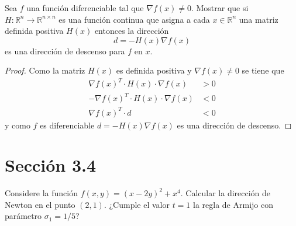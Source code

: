 \documentclass{article}
\newenvironment{theorem}[2][Ejercicio]{\begin{trivlist}
\item[\hskip \labelsep {\bfseries #1}\hskip \labelsep {\bfseries #2.}]}{\end{trivlist}}
\begin{document}
\begin{theorem}{4}
    Sea \(f\) una función diferenciable tal que \(\nabla f(x) \neq 0\).
    Mostrar que si \(H : \mathbb{R}^n \to \mathbb{R}^{n \times n}\) es una función continua que asigna a
    cada \(x \in \mathbb{R}^n\) una matriz definida positiva \(H(x)\) entonces la dirección
    \[
        d = - H(x) \nabla f(x)
    \]
    es una dirección de descenso para \(f\) en \(x\).
\end{theorem}

\begin{proof}
    Como la matriz  \( H(x) \) es definida positiva y \( \nabla f(x) \neq 0 \) se tiene que \begin{align*}
        {\nabla f(x)}^T \cdot H(x) \cdot \nabla f(x)  & > 0 \\
        -{\nabla f(x)}^T \cdot H(x) \cdot \nabla f(x) & < 0 \\
        {\nabla f(x)}^T \cdot d                       & < 0
    \end{align*}
    y como \( f \) es diferenciable \( d = - H(x) \nabla{f(x)} \) es una dirección de descenso.
\end{proof}

\section*{Sección 3.4}
\begin{theorem}{5}
    Considere la función \( f(x,y) = {(x - 2y)}^2 + x^4 \).
    Calcular la dirección de Newton en el punto \((2,1)\).
    ¿Cumple el valor \(t = 1\) la regla de Armijo con parámetro \(\sigma_1 = 1/5\)?
\end{theorem}
\end{document}
